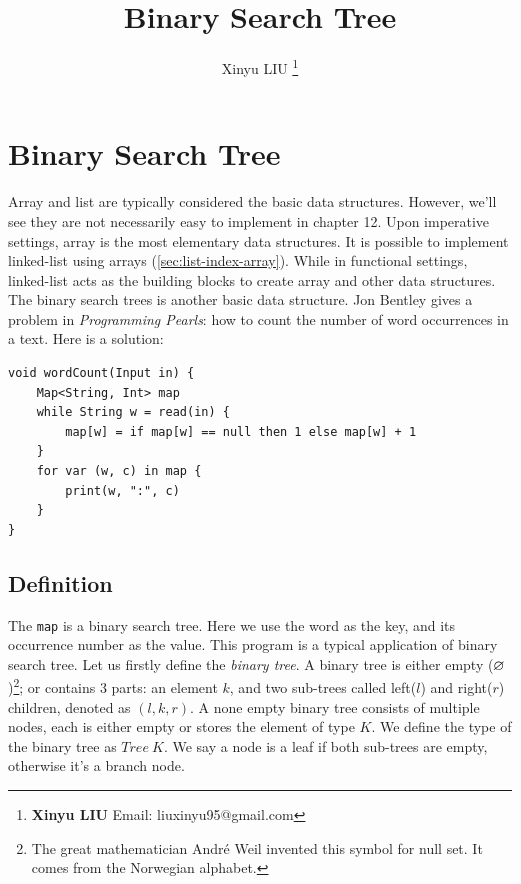 \documentclass[b5paper]{article}
\begin{document}
\title{Binary Search Tree}

\author{Xinyu LIU
\thanks{{\bfseries Xinyu LIU} \newline
  Email: liuxinyu95@gmail.com \newline}
  }

\maketitle
\fi


\ifx\wholebook\relax
\chapter{Binary Search Tree}
\fi

Array and list are typically considered the basic data structures. However, we'll see they are not necessarily easy to implement in chapter 12. Upon imperative settings, array is the most elementary data structures. It is possible to implement linked-list using arrays (\cref{sec:list-index-array}). While in functional settings, linked-list acts as the building blocks to create array and other data structures. The binary search trees is another basic data structure. Jon Bentley gives a problem in {\em Programming Pearls}\cite{Bentley}: how to count the number of word occurrences in a text. Here is a solution:

\lstset{frame=single}
\begin{lstlisting}[language=Bourbaki]
void wordCount(Input in) {
    Map<String, Int> map
    while String w = read(in) {
        map[w] = if map[w] == null then 1 else map[w] + 1
    }
    for var (w, c) in map {
        print(w, ":", c)
    }
}
\end{lstlisting}

\section{Definition}
\label{introduction} 

The \texttt{map} is a binary search tree. Here we use the word as the key, and its occurrence number as the value. This program is a typical application of binary search tree. Let us firstly define the {\em binary tree}. A binary tree is either empty ($\varnothing$)\footnote{The great mathematician André Weil invented this symbol for null set. It comes from the Norwegian alphabet.}; or contains 3 parts: an element $k$, and two sub-trees called left($l$) and right($r$) children, denoted as $(l, k, r)$. A none empty binary tree consists of multiple nodes, each is either empty or stores the element of type $K$. We define the type of the binary tree as $Tree\ K$. We say a node is a leaf if both sub-trees are empty, otherwise it's a branch node.
\end{document}
